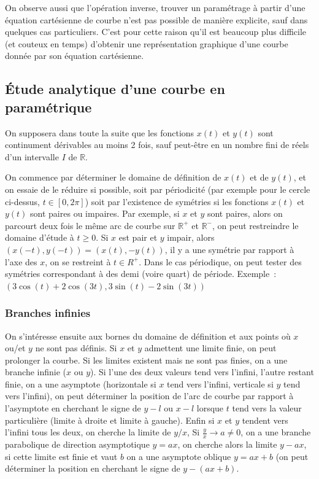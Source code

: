 \documentclass[a4paper,11pt]{article}
\newcommand{\R}{{\mathbb{R}}}
\begin{document}
On observe aussi que l'op\'eration
inverse, trouver un param\'etrage \`a partir d'une \'equation
cart\'esienne de courbe n'est pas possible de mani\`ere
explicite, sauf dans quelques cas particuliers. C'est pour cette
raison qu'il est beaucoup plus difficile (et couteux en temps)
d'obtenir une repr\'esentation graphique d'une courbe donn\'ee
par son \'equation cart\'esienne.

\subsection{\'Etude analytique d'une courbe en param\'etrique}
On supposera dans toute la suite que les fonctions $x(t)$ et $y(t)$
sont continument d\'erivables au moins 2 fois, sauf peut-\^etre
en un nombre fini de r\'eels d'un intervalle $I$ de $\R$.

On commence par d\'eterminer le domaine de d\'efinition de $x(t)$
et de $y(t)$, et on essaie de le r\'eduire si possible, soit par
p\'eriodicit\'e (par exemple pour le cercle ci-dessus, $t \in [0,2 \pi]$)
soit par l'existence de sym\'etries si les fonctions
$x(t)$ et $y(t)$ sont paires ou impaires. Par exemple, si $x$ et $y$
sont paires, alors on parcourt deux fois le m\^eme arc de courbe
sur $\R^+$ et $\R^-$, on peut restreindre le domaine d'\'etude
\`a $t\geq 0$. Si $x$ est pair et $y$ impair, alors 
$(x(-t),y(-t))=(x(t),-y(t))$, il y a une sym\'etrie par rapport \`a
l'axe des $x$, on se restreint \`a $t \in R^+$.
Dans le cas p\'eriodique, on peut tester des sym\'etries correspondant
\`a des demi (voire quart) de p\'eriode.
Exemple~: $(3\cos(t)+2\cos(3t),3\sin(t)-2\sin(3t))$ 

\subsubsection{Branches infinies}
On s'int\'eresse ensuite aux bornes du domaine de d\'efinition
et aux points o\`u $x$ ou/et $y$ ne sont pas d\'efinis.
Si $x$ et $y$ admettent une limite finie, on peut prolonger la
courbe. Si les limites existent mais ne sont pas finies, 
on a une branche infinie ($x$ ou $y$). Si l'une des deux
valeurs tend vers l'infini, l'autre restant finie, on a une
asymptote (horizontale si $x$ tend vers l'infini, verticale
si $y$ tend vers l'infini), on peut d\'eterminer la position
de l'arc de courbe par rapport \`a l'asymptote en
cherchant le signe de $y-l$ ou $x-l$ lorsque $t$ tend
vers la valeur particuli\`ere (limite \`a droite et limite
\`a gauche). Enfin si $x$ et $y$ tendent vers l'infini
tous les deux, on cherche la limite de $y/x$,
Si $\frac{y}{x} \rightarrow a \neq 0$, on a une branche
parabolique 
de direction asymptotique $y=ax$,
on cherche alors la limite
$y-ax$, si cette limite est finie et vaut $b$ 
on a une asymptote oblique $y=ax+b$ (on peut d\'eterminer
la position en cherchant le signe de $y-(ax+b)$.
\end{document}
